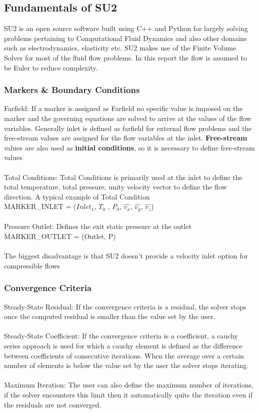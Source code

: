 \subsection{Fundamentals of SU2}
SU2 is an open source software built using C++ and Python for largely solving problems pertaining to Computational Fluid Dynamics and also other domains such as electrodynamics, elasticity etc. SU2 makes use of the Finite Volume Solver for most of the fluid flow problems. In this report the flow is assumed to be Euler to reduce complexity. 
\subsubsection{Markers \& Boundary Conditions}
Farfield: If a marker is assigned as Farfield no specific value is imposed on the marker and the governing equations are solved to arrive at the values of the flow variables. Generally inlet is defined as farfield  for external flow problems and the free-stream values are assigned for the flow variables at the inlet. \textbf{Free-stream} values are also used as \textbf{initial conditions}, so it is necessary to define free-stream values \\
\\
Total Conditions: Total Conditions is primarily used at the inlet to define the total temperature, total pressure, unity velocity vector to define the flow direction. A typical example of Total Condition\\
MARKER\_INLET = ($Inlet_1$, $T_0$ , $P_0$, $\hat {v_x}$, $\hat{v_y}$, $\hat{v_z}$) \\
\\
Pressure Outlet: Defines the exit static pressure at the outlet\\
MARKER\_OUTLET = (Outlet, P)\\
\\
The biggest disadvantage is that SU2 doesn't provide a velocity inlet option for compressible flows\\

\subsubsection{Convergence Criteria}
Steady-State Residual: If the convergence criteria is a residual, the solver stops once the computed residual is smaller than the value set by the user.\\
\\
Steady-State Coefficient: If  the  convergence  criteria  is  a coefficient,  a cauchy series approach  is  used for which a cauchy element is defined as the difference between coefficients of consecutive iterations.  When the average over a certain number of elements is below the value set by the user the solver stops iterating. \\
\\
Maximum Iteration: The user can also define the maximum number of iterations, if the solver encounters this limit then it automatically quits the iteration even if the residuals are not converged.\\


